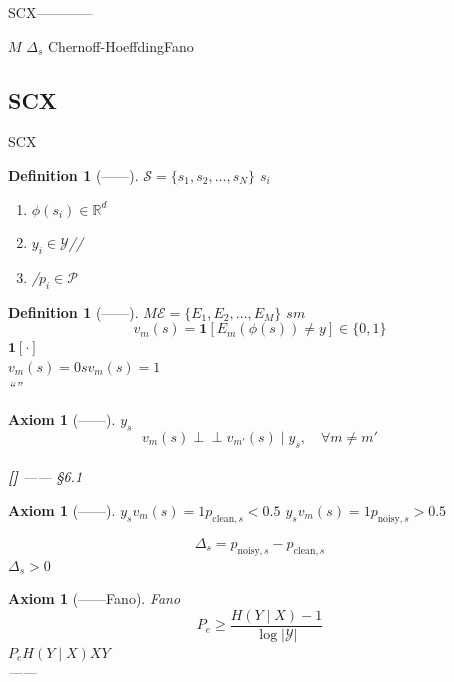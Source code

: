 \documentclass[11pt,a4paper]{article}
\newtheorem{definition}[theorem]{Definition}
\newtheorem{axiom}[theorem]{Axiom}
\theoremstyle{remark}
\newcommand{\indep}{\perp\!\!\!\perp}
\newcommand{\honeststrike}{\textnormal{\textbf{[]}}}
\begin{document}
\textbf{}SCX————

$M$
$\Delta_s$
Chernoff-HoeffdingFano

\subsection{SCX}

SCX\textbf{}

\begin{definition}[——]
\label{def:state_space}
$\mathcal{S} = \{s_1, s_2, \ldots, s_N\}$
$s_i$\textbf{}
\begin{enumerate}[label=(\roman*)]
    \item $\phi(s_i) \in \mathbb{R}^{d}$
    \item $y_i \in \mathcal{Y}$//
    \item /$p_i \in \mathcal{P}$
\end{enumerate}
\textbf{}
\end{definition}

\begin{definition}[——]
\label{def:expert_vote}
$M$$\mathcal{E} = \{E_1, E_2, \ldots, E_M\}$
$s$$m$
\begin{equation}
    v_m(s) = \mathbf{1}[E_m(\phi(s)) \neq y] \in \{0, 1\}
\end{equation}
$\mathbf{1}[\cdot]$\\
\textbf{}$v_m(s) = 0$$s$$v_m(s) = 1$\\
\textbf{}``''
\end{definition}

\begin{axiom}[——]
\label{ax:independence}
$y_s$
\begin{equation}
    v_m(s) \indep v_{m'}(s) \mid y_s, \quad \forall m \neq m' 
\end{equation}
\textbf{}\\
\honeststrike{} ——
\S6.1
\end{axiom}

\begin{axiom}[——]
\label{ax:detection_margin}
$y_s$$v_m(s)=1$$p_{\text{clean}, s} < 0.5$
$y_s$$v_m(s)=1$$p_{\text{noisy}, s} > 0.5$

\begin{equation}
    \boxed{\Delta_s = p_{\text{noisy}, s} - p_{\text{clean}, s}} 
\end{equation}
$\Delta_s > 0$\\
\textbf{}
\textbf{}
\end{axiom}

\begin{axiom}[——Fano]
\label{ax:fano}
Fano
\begin{equation}
    P_e \geq \frac{H(Y \mid X) - 1}{\log |\mathcal{Y}|}
\end{equation}
$P_e$$H(Y \mid X)$$X$$Y$\\
\textbf{}
\textbf{}——
\end{axiom}
\end{document}
